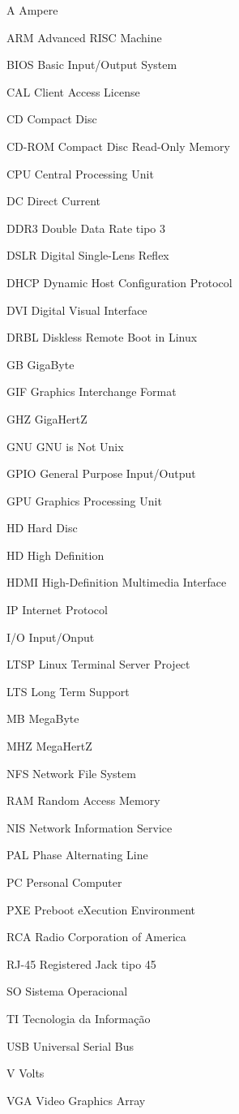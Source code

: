 \documentclass[
	12pt,				%
	openright,			%
	twoside,			%
	a4paper,			%
	chapter=TITLE,		%
	english,			%
	brazil				%
	]{abntex2}
\begin{document}
\begin{siglas}						
\item[A] Ampere
\item[ARM] Advanced RISC Machine
\item[BIOS] Basic Input/Output System
\item[CAL] Client Access License
\item[CD] Compact Disc
\item[CD-ROM] Compact Disc Read-Only Memory
\item[CPU] Central Processing Unit
\item[DC] Direct Current
\item[DDR3] Double Data Rate tipo 3 
\item[DSLR] Digital Single-Lens Reflex
\item[DHCP] Dynamic Host Configuration Protocol
\item[DVI] Digital Visual Interface
\item[DRBL] Diskless Remote Boot in Linux
\item[GB] GigaByte
\item[GIF] Graphics Interchange Format
\item[GHZ] GigaHertZ
\item[GNU] GNU is Not Unix
\item[GPIO] General Purpose Input/Output
\item[GPU] Graphics Processing Unit
\item[HD] Hard Disc
\item[HD] High Definition
\item[HDMI] High-Definition Multimedia Interface
\item[IP] Internet Protocol
\item[I/O] Input/Onput
\item[LTSP] Linux Terminal Server Project
\item[LTS] Long Term Support
\item[MB] MegaByte
\item[MHZ] MegaHertZ
\item[NFS] Network File System
\item[RAM] Random Access Memory
\item[NIS] Network Information Service
\item[PAL] Phase Alternating Line
\item[PC] Personal Computer
\item[PXE] Preboot eXecution Environment
\item[RCA] Radio Corporation of America
\item[RJ-45] Registered Jack tipo 45
\item[SO] Sistema Operacional
\item[TI] Tecnologia da Informação
\item[USB] Universal Serial Bus
\item[V] Volts
\item[VGA] Video Graphics Array

\end{siglas}
\end{document}
